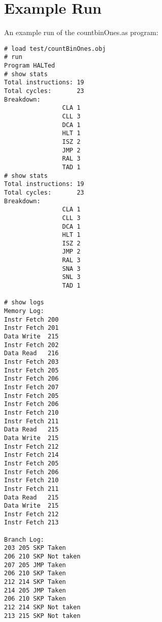 \documentclass[11pt]{exam}
\begin{document}
\section{Example Run}
An example run of the countbinOnes.as program:

\begin{multicols}{2}
{\small
\begin{verbatim}
# load test/countBinOnes.obj
# run
Program HALTed
# show stats
Total instructions: 19
Total cycles:       23
Breakdown:
                CLA 1
                CLL 3
                DCA 1
                HLT 1
                ISZ 2
                JMP 2
                RAL 3
                TAD 1
# show stats
Total instructions: 19
Total cycles:       23
Breakdown:        
                CLA 1
                CLL 3
                DCA 1
                HLT 1
                ISZ 2
                JMP 2
                RAL 3
                SNA 3
                SNL 3
                TAD 1

# show logs
Memory Log:
Instr Fetch 200
Instr Fetch 201
Data Write  215
Instr Fetch 202
Data Read   216
Instr Fetch 203
Instr Fetch 205
Instr Fetch 206
Instr Fetch 207
Instr Fetch 205
Instr Fetch 206
Instr Fetch 210
Instr Fetch 211
Data Read   215
Data Write  215
Instr Fetch 212
Instr Fetch 214
Instr Fetch 205
Instr Fetch 206
Instr Fetch 210
Instr Fetch 211
Data Read   215
Data Write  215
Instr Fetch 212
Instr Fetch 213

Branch Log:
203 205 SKP Taken
206 210 SKP Not taken
207 205 JMP Taken
206 210 SKP Taken
212 214 SKP Taken
214 205 JMP Taken
206 210 SKP Taken
212 214 SKP Not taken
213 215 SKP Not taken
\end{verbatim}
}
\end{multicols}
\end{document}
